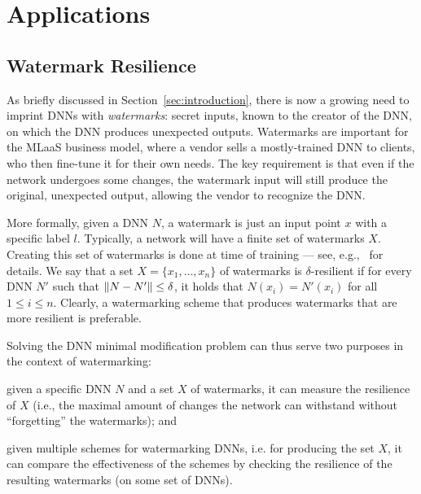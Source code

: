 \documentclass{easychair}
\begin{document}
\section{Applications}

\subsection{Watermark Resilience}
As briefly discussed in Section~\ref{sec:introduction}, there is now a
growing need to imprint DNNs with \emph{watermarks}: secret inputs,
known to the creator of the DNN, on which the DNN produces unexpected
outputs. Watermarks are important for the MLaaS business model, where
a vendor sells a mostly-trained DNN to clients, who then fine-tune
it for their own needs. The key requirement is that even if the
network undergoes some changes, the watermark input will still produce
the original, unexpected output, allowing the vendor to recognize the
DNN.

More formally, given a DNN $N$, a watermark is just an input point $x$
with a specific label $l$. Typically, a network will have a finite set of
watermarks $X$. Creating this set of watermarks is done at time of
training --- see, e.g.,~\cite{AdBaPiKeWatermarking} for details. We
say that a set $X=\{x_1,\ldots,x_n\}$ of watermarks is $\delta$-resilient if for every
DNN $N'$ such that $\left\lVert N-N'\right\rVert\leq \delta$, it holds that
$N(x_i)=N'(x_i)$ for all $1\leq i \leq n$. Clearly, a watermarking
scheme that produces watermarks that are more resilient is preferable.

Solving the DNN minimal modification problem can thus serve two
purposes in the context of watermarking:
\begin{inparaenum}[(i)]
  \item given a specific DNN $N$ and a set $X$ of watermarks, it can
    measure the resilience of $X$ (i.e., the maximal amount of changes
    the network can withstand without ``forgetting'' the watermarks);
    and
  \item given multiple schemes for watermarking DNNs, i.e. for
    producing the set $X$, it can compare the effectiveness of the
    schemes by checking the resilience of the resulting watermarks
    (on some set of DNNs).
\end{inparaenum}
  
\end{document}
